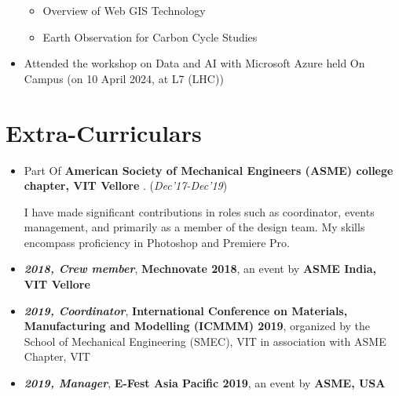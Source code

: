 \documentclass[10.8pt, a4paper]{extarticle}
\newcommand{\shorterSection}[1]{\vspace{-10pt}\section{#1}}
\begin{document}
\begin{itemize}
\begin{itemize}
    \item Overview of Web GIS Technology \href{https://drive.google.com/file/d/1bQc-tYUv5at-NuImsrSm_pfTs4rRgWi2/view?usp=drive_link}{\faLink{}}
    
    \item Earth Observation for Carbon Cycle Studies \href{https://drive.google.com/file/d/1SYKP6BzNcmPcVS8MiXt31NDexVP9gFDn/view?usp=sharing}{\faLink{}}
    
\end{itemize} 

  \item Attended the workshop on Data and AI with Microsoft Azure held On Campus (on 10 April 2024, at L7 (LHC))\\[-0.6cm]
  
\vspace{4mm}
\end{itemize}
\vspace{4mm}

\shorterSection{Extra-Curriculars}
\begin{itemize}
\item Part Of \textbf{American Society of Mechanical Engineers (ASME) college chapter, VIT Vellore }. \href{https://m.facebook.com/story.php?story_fbid=pfbid02PFELcj2eSP5jKHCXbLVLbEHxS8VHwkXKTn5VppoYcqn2MsAU6kcHg1noYHc1g59Yl&id=406549079357847&mibextid=Nif5oz}{\faLink{}} \hfill\hfill(\textit{Dec'17-Dec'19}) 

I have made significant contributions in roles such as coordinator, events management, and primarily as a member of the design team. My skills encompass proficiency in Photoshop and Premiere Pro.

\item \textit{\textbf{2018, Crew member}}, \textbf{Mechnovate 2018}, an event by \textbf{ASME India, VIT Vellore} \href{https://drive.google.com/file/d/1skeeRg3UISDUtRxwI7Nfen7c6zbsuysX/view?usp=sharing}{\faLink{}}

\item \textit{\textbf{2019, Coordinator}}, \textbf{International Conference on Materials, Manufacturing and Modelling (ICMMM) 2019}, organized by the School of Mechanical Engineering (SMEC), VIT in association with ASME Chapter, VIT \href{https://drive.google.com/file/d/1skeeRg3UISDUtRxwI7Nfen7c6zbsuysX/view?usp=sharing}{\faLink{}}

\item \textit{\textbf{2019, Manager}}, \textbf{E-Fest Asia Pacific 2019}, an event by \textbf{ASME, USA} \href{https://drive.google.com/file/d/1skeeRg3UISDUtRxwI7Nfen7c6zbsuysX/view?usp=sharing}{\faLink{}} \href{https://efests.asme.org/gallery/images/e-fest-asia-pacific-2019}{\faLink{}}

\vspace{4mm}
\end{itemize}
\vspace{4mm}
\end{document}
